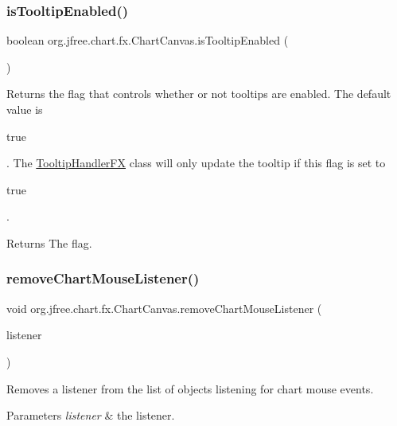 \subsubsection{\texorpdfstring{is\+Tooltip\+Enabled()}{isTooltipEnabled()}}
{\footnotesize\ttfamily boolean org.\+jfree.\+chart.\+fx.\+Chart\+Canvas.\+is\+Tooltip\+Enabled (\begin{DoxyParamCaption}{ }\end{DoxyParamCaption})}

Returns the flag that controls whether or not tooltips are enabled. The default value is
\begin{DoxyCode}
\textcolor{keyword}{true} 
\end{DoxyCode}
 . The \mbox{\hyperlink{}{Tooltip\+Handler\+FX}} class will only update the tooltip if this flag is set to 
\begin{DoxyCode}
\textcolor{keyword}{true} 
\end{DoxyCode}
 .

\begin{DoxyReturn}{Returns}
The flag. 
\end{DoxyReturn}
\mbox{\label{classorg_1_1jfree_1_1chart_1_1fx_1_1_chart_canvas_a0d2b10e5af6a54e696b1810892b8fb64}} 
\subsubsection{\texorpdfstring{remove\+Chart\+Mouse\+Listener()}{removeChartMouseListener()}}
{\footnotesize\ttfamily void org.\+jfree.\+chart.\+fx.\+Chart\+Canvas.\+remove\+Chart\+Mouse\+Listener (\begin{DoxyParamCaption}\item[{\mbox{\hyperlink{interfaceorg_1_1jfree_1_1chart_1_1fx_1_1interaction_1_1_chart_mouse_listener_f_x}{Chart\+Mouse\+Listener\+FX}}}]{listener }\end{DoxyParamCaption})}

Removes a listener from the list of objects listening for chart mouse events.


\begin{DoxyParams}{Parameters}
{\em listener} & the listener. \\
\hline
\end{DoxyParams}
\mbox{\label{classorg_1_1jfree_1_1chart_1_1fx_1_1_chart_canvas_a5b3cc71177f4353b1f1a98082e2b0e55}} 

